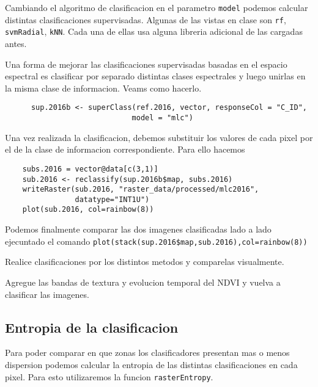 Cambiando el algoritmo de clasificacion en el parametro \texttt{model} podemos
calcular distintas clasificaciones supervisadas. Algunas de las vistas en clase
son \texttt{rf}, \texttt{svmRadial}, \texttt{kNN}. Cada una de ellas usa alguna
libreria adicional de las cargadas antes.

\begin{exa}
  Una forma de mejorar las clasificaciones supervisadas basadas en el espacio
  espectral es clasificar por separado distintas clases espectrales y luego unirlas
  en la misma clase de informacion. Veams como hacerlo.
  \begin{lstlisting}
      sup.2016b <- superClass(ref.2016, vector, responseCol = "C_ID",
                             model = "mlc")
  \end{lstlisting}

  Una vez realizada la clasificacion, debemos substituir los valores de cada pixel
  por el de la clase de informacion correspondiente. Para ello hacemos

  \begin{lstlisting}
    subs.2016 = vector@data[c(3,1)]
    sub.2016 <- reclassify(sup.2016b$map, subs.2016)
    writeRaster(sub.2016, "raster_data/processed/mlc2016",
                datatype="INT1U")
    plot(sub.2016, col=rainbow(8))
  \end{lstlisting}


    Podemos finalmente comparar las dos imagenes clasificadas lado a lado ejecuntado el
    comando \verb|plot(stack(sup.2016$map,sub.2016),col=rainbow(8))|
\end{exa}

\begin{act}
    Realice clasificaciones por los distintos metodos y comparelas visualmente.
\end{act}

\begin{act}
    Agregue las bandas de textura y evolucion temporal del NDVI y vuelva a clasificar
    las imagenes.
\end{act}

\subsection{Entropia de la clasificacion}

Para poder comparar en que zonas los clasificadores presentan mas o menos
dispersion podemos calcular la entropia de las distintas clasificaciones en cada
pixel. Para esto utilizaremos la funcion \texttt{rasterEntropy}.


